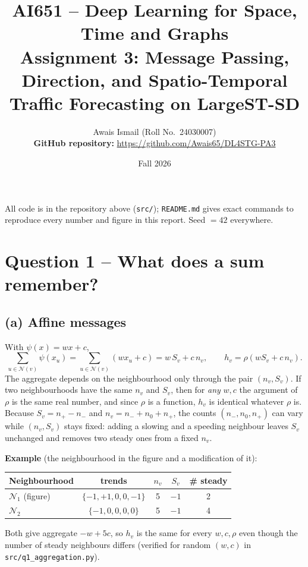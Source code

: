 \documentclass[11pt]{article}
\title{AI651 -- Deep Learning for Space, Time and Graphs\\[2pt] \large Assignment 3: Message Passing, Direction, and Spatio-Temporal Traffic Forecasting on LargeST-SD}
\author{Awais Ismail \quad (Roll No.\ 24030007)\\[4pt] \textbf{GitHub repository:} \url{https://github.com/Awais65/DL4STG-PA3}}
\date{Fall 2026}
\newcommand{\N}{\mathcal{N}}
\begin{document}
\maketitle

\noindent All code is in the repository above (\texttt{src/}); \texttt{README.md} gives exact
commands to reproduce every number and figure in this report. Seed $=42$ everywhere.

\section*{Question 1 -- What does a sum remember?}

\subsection*{(a) Affine messages}
With $\psi(x)=wx+c$,
\[
\sum_{u\in\N(v)}\psi(x_u)=\sum_{u\in\N(v)}(wx_u+c)=w\,S_v+c\,n_v,
\qquad h_v=\rho\!\left(w S_v + c\, n_v\right).
\]
The aggregate depends on the neighbourhood only through the pair $(n_v,S_v)$. If two
neighbourhoods have the same $n_v$ and $S_v$, then for \emph{any} $w,c$ the argument of $\rho$ is the
same real number, and since $\rho$ is a function, $h_v$ is identical whatever $\rho$ is.
Because $S_v=n_+-n_-$ and $n_v=n_-+n_0+n_+$, the counts $(n_-,n_0,n_+)$ can vary while
$(n_v,S_v)$ stays fixed: adding a slowing and a speeding neighbour leaves $S_v$ unchanged and
removes two steady ones from a fixed $n_v$.

\noindent\textbf{Example} (the neighbourhood in the figure and a modification of it):
\begin{center}
\begin{tabular}{lcccc}\toprule
Neighbourhood & trends & $n_v$ & $S_v$ & \# steady\\\midrule
$\N_1$ (figure) & $\{-1,+1,0,0,-1\}$ & 5 & $-1$ & 2\\
$\N_2$ & $\{-1,0,0,0,0\}$ & 5 & $-1$ & 4\\\bottomrule
\end{tabular}
\end{center}
Both give aggregate $-w+5c$, so $h_v$ is the same for every $w,c,\rho$ even though the number of
steady neighbours differs (verified for random $(w,c)$ in \texttt{src/q1\_aggregation.py}).
\end{document}
